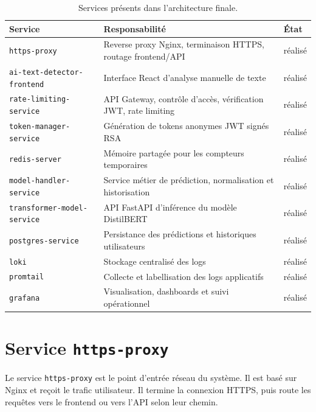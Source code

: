 ﻿\documentclass[12pt, a4paper]{report}
\begin{document}
\begin{table}[H]
\centering
\renewcommand{\arraystretch}{1.35}
\begin{tabular}{p{}p{}p{}}
\toprule
\textbf{Service} & \textbf{Responsabilité} & \textbf{État} \\
\midrule
\texttt{https-proxy} & Reverse proxy Nginx, terminaison HTTPS, routage frontend/API & réalisé \\
\texttt{ai-text-detector}\newline\texttt{-frontend} & Interface React d'analyse manuelle de texte & réalisé \\
\texttt{rate-limiting}\newline\texttt{-service} & API Gateway, contrôle d'accès, vérification JWT, rate limiting & réalisé \\
\texttt{token-manager}\newline\texttt{-service} & Génération de tokens anonymes JWT signés RSA & réalisé \\
\texttt{redis-server} & Mémoire partagée pour les compteurs temporaires & réalisé \\
\texttt{model-handler}\newline\texttt{-service} & Service métier de prédiction, normalisation et historisation & réalisé \\
\texttt{transformer-model}\newline\texttt{-service} & API FastAPI d'inférence du modèle DistilBERT & réalisé \\
\texttt{postgres}\newline\texttt{-service} & Persistance des prédictions et historiques utilisateurs & réalisé \\
\texttt{loki} & Stockage centralisé des logs & réalisé \\
\texttt{promtail} & Collecte et labellisation des logs applicatifs & réalisé \\
\texttt{grafana} & Visualisation, dashboards et suivi opérationnel & réalisé \\
\bottomrule
\end{tabular}
\caption{Services présents dans l'architecture finale.}
\label{tab:services-etat}
\end{table}

\section{Service \texttt{https-proxy}}

Le service \texttt{https-proxy} est le point d'entrée réseau du système. Il est
basé sur Nginx et reçoit le trafic utilisateur. Il termine la connexion HTTPS,
puis route les requêtes vers le frontend ou vers l'API selon leur chemin.
\end{document}
